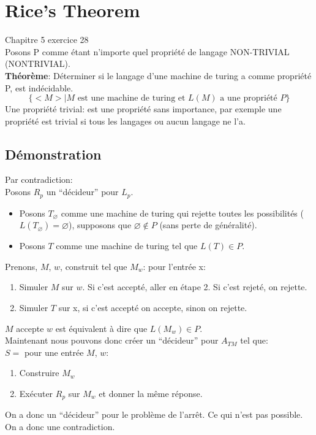 \documentclass[a4paper,12pt]{article}
\begin{document}
\section{Rice's Theorem}
  Chapitre 5 exercice 28\\
  Posons P comme étant n'importe quel propriété de langage NON-TRIVIAL (NONTRIVIAL).\\
  \textbf{Théorème}: Déterminer si le langage d'une machine de turing a comme propriété P, est indécidable.\\
  $$\{<M> | M \text{ est une machine de turing et } L(M) \text{ a une propriété } P\}$$
  Une propriété trivial: est une propriété sans importance, par exemple une propriété est trivial si tous les langages ou aucun langage ne l'a.\\
  
  \subsection{Démonstration}
    Par contradiction:\\
    Posons $R_p$ un ``décideur'' pour $L_p$.  
    \begin{itemize}
      \item Posons $T_{\varnothing}$ comme une machine de turing qui rejette toutes les possibilités ($L(T_{\varnothing}) = \varnothing$), supposons que $\varnothing \notin P$ (sans perte de généralité).
      \item Posons $T$ comme une machine de turing tel que $L(T) \in P$.\\
    \end{itemize}
    Prenons, $M$, $w$, construit tel que $M_w$: pour l'entrée x:
    \begin{enumerate}
      \item Simuler $M$ sur $w$.  Si c'est accepté, aller en étape 2.  Si c'est rejeté, on rejette.
      \item Simuler $T$ sur x, si c'est accepté on accepte, sinon on rejette.
    \end{enumerate}
    $M$ accepte $w$ est équivalent à dire que $L(M_w) \in P$.\\
    Maintenant nous pouvons donc créer un ``décideur'' pour $A_{TM}$ tel que:\\
    $S = $ pour une entrée $M$, $w$:
    \begin{enumerate}
      \item Construire $M_w$
      \item Exécuter $R_p$ sur $M_w$ et donner la même réponse.
    \end{enumerate}
    On a donc un ``décideur'' pour le problème de l'arrêt.  Ce qui n'est pas possible.  On a donc une contradiction.


  
\end{document}
